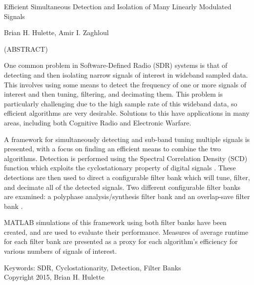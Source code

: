 \documentclass[12pt]{article}
\begin{document}
\newcommand{\fourier}{\mathcal{F}}


\thispagestyle{empty}
\begin{center}

{\large Efficient Simultaneous Detection and Isolation of
Many Linearly Modulated Signals}

\vfill

Brian H. Hulette, Amir I. Zaghloul

\vfill

(ABSTRACT)

\vfill

\end{center}

One common problem in Software-Defined Radio (SDR) systems is that of detecting
and then isolating narrow signals of interest in wideband sampled data. This
involves using some means to detect the frequency of one or more signals of
interest and then tuning, filtering, and decimating them. This problem is
particularly challenging due to the high sample rate of this wideband data, so
efficient algorithms are very desirable. Solutions to this have applications in
many areas, including both Cognitive Radio and Electronic Warfare.

A framework for simultaneously detecting and sub-band tuning multiple signals
is presented, with a focus on finding an efficient means to combine the two
algorithms.  Detection is performed using the Spectral Correlation Density
(SCD) function which exploits the cyclostationary property of digital signals
\cite{Gardner1}.  These detections are then used to direct a configurable
filter bank which will tune, filter, and decimate all of the detected signals.
Two different configurable filter banks are examined: a polyphase
analysis/synthesis filter bank \cite{Harris2} and an overlap-save filter bank
\cite{Borgerding1}.

MATLAB simulations of this framework using both filter banks have been created,
and are used to evaluate their performance. Measures of average runtime for
each filter bank are presented as a proxy for each algorithm's efficiency for
various numbers of signals of interest.

\vfill

\begin{center}
Keywords: SDR, Cyclostationarity, Detection, Filter Banks
\\
Copyright 2015, Brian H. Hulette
\end{center}
\end{document}
